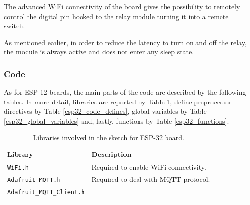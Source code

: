 The advanced WiFi connectivity of the board gives the possibility to remotely control the digital pin hooked to the relay module turning it into a remote switch.

As mentioned earlier, in order to reduce the latency to turn on and off the relay, the module is always active and does not enter any sleep state.


\subsubsection{Code}
As for ESP-12 boards, the main parts of the code are described by the following tables. In more detail, libraries are reported by Table \ref{esp32_code_libraries}, define preprocessor directives by Table \ref{esp32_code_defines}, global variables by Table \ref{esp32_global_variables} and, lastly, functions by Table \ref{esp32_functions}.

\noindent\begin{minipage}{\textwidth}
	\begingroup
	\setlength{\LTleft}{-20cm plus -1fill}
	\setlength{\LTright}{\LTleft}
	\begin{longtable}{l | l}
		\hline
		\textbf{Library} & \textbf{Description} \\
		\hline
		\hline
		\texttt{WiFi.h} & Required to enable WiFi connectivity. \\
		\hline
		\texttt{Adafruit\_MQTT.h} & Required to deal with MQTT protocol. \\ 
		\texttt{Adafruit\_MQTT\_Client.h} & \\
		\hline
		
		\caption{Libraries involved in the sketch for ESP-32 board.}
		\label{esp32_code_libraries}
	\end{longtable}
	\endgroup
\end{minipage}

